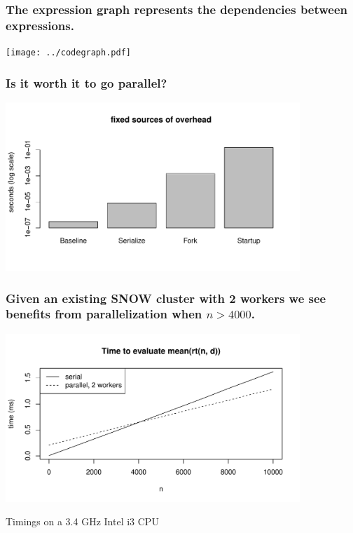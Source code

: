 \documentclass{beamer}
\begin{document}
\begin{frame}

    \frametitle{The expression graph represents the dependencies between
    expressions.}

    \centerline{\texttt{[image: ../codegraph.pdf]}}

\end{frame}
\begin{frame}


\frametitle{Is it worth it to go parallel?}

    \centerline{\includegraphics[height=2.5in]{../compute_times/overhead}}




\end{frame}
\begin{frame}

\frametitle{Given an existing SNOW cluster with 2 workers we see benefits
    from parallelization when $n > 4000$.}

\centerline{\includegraphics[height=2.5in]{../compute_times/ser_vs_par.pdf}}

Timings on a 3.4 GHz Intel i3 CPU

\end{frame}
\end{document}

